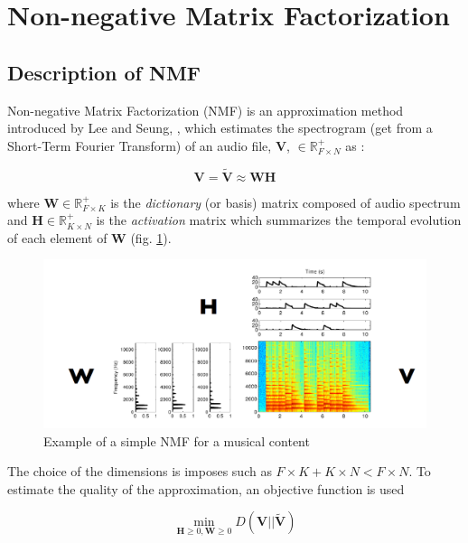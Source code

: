 \documentclass[twocolumn,a4paper,10pt]{article}
\begin{document}
\section{Non-negative Matrix Factorization}\label{part:nmf}
\subsection{Description of NMF}
Non-negative Matrix Factorization (NMF) is an approximation method introduced by Lee and Seung, \cite{lee_learning_1999}, which estimates the spectrogram (get from a Short-Term Fourier Transform) of an audio file, $\mathbf{V}$, $\in \mathbb{R}^+_{F \times N}$ as : 

\begin{equation}\label{eq:nmf}
\mathbf{V} = \mathbf{\tilde{V}} \approx \mathbf{WH}
\end{equation}

where $\mathbf{W} \in \mathbb{R}^+_{F \times K}$ is the \textit{dictionary} (or basis) matrix composed of audio spectrum and $\mathbf{H} \in \mathbb{R}^+_{K \times N}$ is the \textit{activation} matrix which summarizes the temporal evolution of each element of $\mathbf{W}$ (fig.  \ref{fig:example_NMF}). 

\begin{figure}[hbtp]
\centering
\includegraphics[width=0.9\linewidth]{../image/illustration_NMF.PNG}
\caption{Example of a simple NMF  for a musical content \cite{bertin_les_2009}}
\label{fig:example_NMF}
\end{figure}

The choice of the dimensions is imposes such as $F\times K + K \times N < F \times N$. To estimate the quality of the approximation, an objective function is used 

\begin{equation}\label{eq:min-D-WH}
\underset{\mathbf{H} \geq 0, \mathbf{W} \geq 0}{\min} D\left(\mathbf{V} \vert \vert \mathbf{\tilde{V}}\right)
\end{equation}
\end{document}
